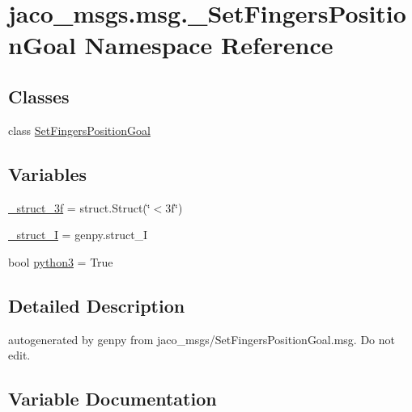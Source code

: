 \hypertarget{namespacejaco__msgs_1_1msg_1_1__SetFingersPositionGoal}{}\section{jaco\+\_\+msgs.\+msg.\+\_\+\+Set\+Fingers\+Position\+Goal Namespace Reference}
\label{namespacejaco__msgs_1_1msg_1_1__SetFingersPositionGoal}
\subsection*{Classes}
\begin{DoxyCompactItemize}
\item 
class \hyperlink{classjaco__msgs_1_1msg_1_1__SetFingersPositionGoal_1_1SetFingersPositionGoal}{Set\+Fingers\+Position\+Goal}
\end{DoxyCompactItemize}
\subsection*{Variables}
\begin{DoxyCompactItemize}
\item 
\hyperlink{namespacejaco__msgs_1_1msg_1_1__SetFingersPositionGoal_a3a3b16d5511096ef51a164ea187e26ca}{\+\_\+struct\+\_\+3f} = struct.\+Struct(\char`\"{}$<$3f\char`\"{})
\item 
\hyperlink{namespacejaco__msgs_1_1msg_1_1__SetFingersPositionGoal_a840b83e8b2b747bfae2f2eb182ba547d}{\+\_\+struct\+\_\+I} = genpy.\+struct\+\_\+I
\item 
bool \hyperlink{namespacejaco__msgs_1_1msg_1_1__SetFingersPositionGoal_a546cf85ea3d1ce550dbad38016d71e66}{python3} = True
\end{DoxyCompactItemize}


\subsection{Detailed Description}
\begin{DoxyVerb}autogenerated by genpy from jaco_msgs/SetFingersPositionGoal.msg. Do not edit.\end{DoxyVerb}
 

\subsection{Variable Documentation}
